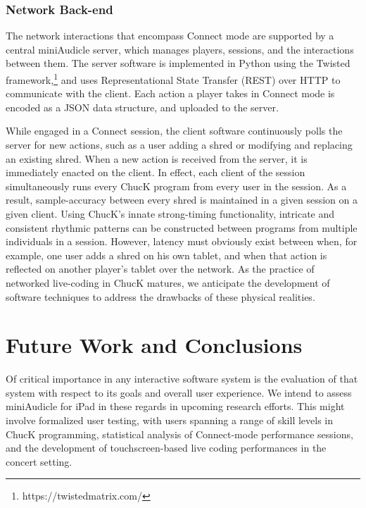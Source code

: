\documentclass{article}
\begin{document}
\subsubsection{Network Back-end}

The network interactions that encompass Connect mode are supported by a central miniAudicle server, which manages players, sessions, and the interactions between them. 
The server software is implemented in Python using the Twisted framework,\footnote{https://twistedmatrix.com/} and uses Representational State Transfer (REST) over HTTP to communicate with the client. 
Each action a player takes in Connect mode is encoded as a JSON data structure, and uploaded to the server. 

While engaged in a Connect session, the client software continuously polls the server for new actions, such as a user adding a shred or modifying and replacing an existing shred. 
When a new action is received from the server, it is immediately enacted on the client. 
In effect, each client of the session simultaneously runs every ChucK program from every user in the session. 
As a result, sample-accuracy between every shred is maintained in a given session on a given client. 
Using ChucK's innate strong-timing functionality, intricate and consistent rhythmic patterns can be constructed between programs from multiple individuals in a session. 
However, latency must obviously exist between when, for example, one user adds a shred on his own tablet, and when that action is reflected on another player's tablet over the network. 
As the practice of networked live-coding in ChucK matures, we anticipate the development of software techniques to address the drawbacks of these physical realities. 

\section{Future Work and Conclusions}\label{sec:conclusions}

Of critical importance in any interactive software system is the evaluation of that system with respect to its goals and overall user experience. 
We intend to assess miniAudicle for iPad in these regards in upcoming research efforts. This might involve formalized user testing, with users spanning a range of skill levels in ChucK programming, statistical analysis of Connect-mode performance sessions, and the development of touchscreen-based live coding performances in the concert setting. 
\end{document}
